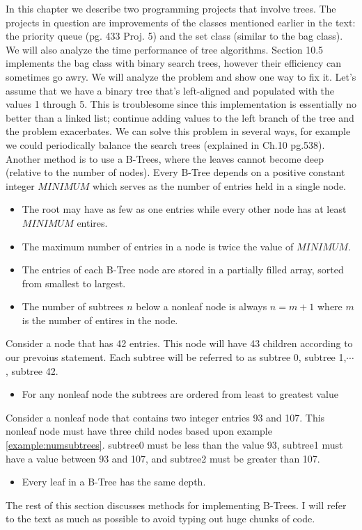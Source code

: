 In this chapter we describe two programming projects that involve trees. The projects in question are improvements of the classes mentioned earlier in the text: the priority queue (pg. 433 Proj. 5) and the set class (similar to the bag class). We will also analyze the time performance of tree algorithms.
Section 10.5 implements the bag class with binary search trees, however their efficiency can sometimes go awry. We will analyze the problem and show one way to fix it.
Let's assume that we have a binary tree that's left-aligned and populated with the values 1 through 5. This is troublesome since this implementation is essentially no better than a linked list; continue adding values to the left branch of the tree and the problem exacerbates. We can solve this problem in several ways, for example we could periodically balance the search trees (explained in Ch.10 pg.538). Another method is to use a B-Trees, where the leaves cannot become deep (relative to the number of nodes).
Every B-Tree depends on a positive constant integer $MINIMUM$ which serves as the number of entries held in a single node.
\begin{itemize}
\item The root may have as few as one entries while every other node has at least $MINIMUM$ entires.
\item The maximum number of entries in a node is twice the value of $MINIMUM$.
\item The entries of each B-Tree node are stored in a partially filled array, sorted from smallest to largest.
\item The number of subtrees $n$ below a nonleaf node is always $n=m+1$ where $m$ is the number of entires in the node.
\end{itemize}
\begin{example}\label{example:numsubtrees}
Consider a node that has 42 entries. This node will have 43 children according to our prevoius statement. Each subtree will be referred to as subtree 0, subtree 1,$\cdots$, subtree 42.
\end{example}
\begin{itemize}
\item For any nonleaf node the subtrees are ordered from least to greatest value
\end{itemize}
\begin{example}
Consider a nonleaf node that contains two integer entries 93 and 107. This nonleaf node must have three child nodes based upon example \ref{example:numsubtrees}. subtree0 must be less than the value 93, subtree1 must have a value between 93 and 107, and subtree2 must be greater than 107.
\end{example}
\begin{itemize}
\item Every leaf in a B-Tree has the same depth.
\end{itemize}
The rest of this section discusses methods for implementing B-Trees. I will refer to the text as much as possible to avoid typing out huge chunks of code.

